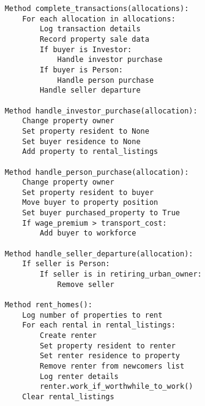 {\begin{verbatim}
    Method complete_transactions(allocations):
        For each allocation in allocations:
            Log transaction details
            Record property sale data
            If buyer is Investor:
                Handle investor purchase
            If buyer is Person:
                Handle person purchase
            Handle seller departure

    Method handle_investor_purchase(allocation):
        Change property owner
        Set property resident to None
        Set buyer residence to None
        Add property to rental_listings

    Method handle_person_purchase(allocation):
        Change property owner
        Set property resident to buyer
        Move buyer to property position
        Set buyer purchased_property to True
        If wage_premium > transport_cost:
            Add buyer to workforce

    Method handle_seller_departure(allocation):
        If seller is Person:
            If seller is in retiring_urban_owner:
                Remove seller

    Method rent_homes():
        Log number of properties to rent
        For each rental in rental_listings:
            Create renter
            Set property resident to renter
            Set renter residence to property
            Remove renter from newcomers list
            Log renter details
            renter.work_if_worthwhile_to_work()
        Clear rental_listings
\end{verbatim} }